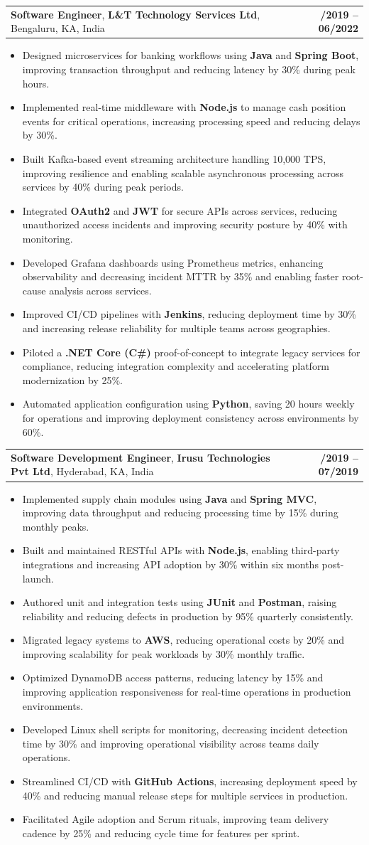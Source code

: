 \documentclass[letterpaper,11pt]{article}
\makeatletter
\newcommand{\resumeItem}[1]{
  \item\footnotesize{
    {#1 \vspace{-2pt}}
  }
}
\newcommand{\resumeSubheading}[4]{
  \vspace{-2pt}\item
    \begin{tabular*}{1.0\textwidth}[t]{l@{\extracolsep{\fill}}r}
      \textbf{\fontsize{10pt}{14pt}\selectfont #3}, \textbf{\fontsize{10pt}{14pt}\selectfont #1}, \fontsize{10pt}{14pt}\selectfont #4 & \textbf{\fontsize{10pt}{14pt}\selectfont #2} \\
    \end{tabular*}\vspace{-7pt}
}
\newcommand{\resumeItemListStart}{\begin{itemize}[leftmargin=*]}
\newcommand{\resumeItemListEnd}{\end{itemize}\vspace{-5pt}}
\makeatother
\begin{document}
    \resumeSubheading
        {L\&T Technology Services Ltd}{08/2019 -- 06/2022}
        {Software Engineer}{Bengaluru, KA, India}
      \resumeItemListStart
        \resumeItem{Designed microservices for banking workflows using \textbf{Java} and \textbf{Spring Boot}, improving transaction throughput and reducing latency by 30\% during peak hours.}
        \resumeItem{Implemented real-time middleware with \textbf{Node.js} to manage cash position events for critical operations, increasing processing speed and reducing delays by 30\%.}
        \resumeItem{Built Kafka-based event streaming architecture handling 10,000 TPS, improving resilience and enabling scalable asynchronous processing across services by 40\% during peak periods.}
        \resumeItem{Integrated \textbf{OAuth2} and \textbf{JWT} for secure APIs across services, reducing unauthorized access incidents and improving security posture by 40\% with monitoring.}
        \resumeItem{Developed Grafana dashboards using Prometheus metrics, enhancing observability and decreasing incident MTTR by 35\% and enabling faster root-cause analysis across services.}
        \resumeItem{Improved CI/CD pipelines with \textbf{Jenkins}, reducing deployment time by 30\% and increasing release reliability for multiple teams across geographies.}
        \resumeItem{Piloted a \textbf{.NET Core (C\#)} proof-of-concept to integrate legacy services for compliance, reducing integration complexity and accelerating platform modernization by 25\%.}
        \resumeItem{Automated application configuration using \textbf{Python}, saving 20 hours weekly for operations and improving deployment consistency across environments by 60\%.}
      \resumeItemListEnd

    \resumeSubheading
        {Irusu Technologies Pvt Ltd}{01/2019 -- 07/2019}
        {Software Development Engineer}{Hyderabad, KA, India}
      \resumeItemListStart
        \resumeItem{Implemented supply chain modules using \textbf{Java} and \textbf{Spring MVC}, improving data throughput and reducing processing time by 15\% during monthly peaks.}
        \resumeItem{Built and maintained RESTful APIs with \textbf{Node.js}, enabling third-party integrations and increasing API adoption by 30\% within six months post-launch.}
        \resumeItem{Authored unit and integration tests using \textbf{JUnit} and \textbf{Postman}, raising reliability and reducing defects in production by 95\% quarterly consistently.}
        \resumeItem{Migrated legacy systems to \textbf{AWS}, reducing operational costs by 20\% and improving scalability for peak workloads by 30\% monthly traffic.}
        \resumeItem{Optimized DynamoDB access patterns, reducing latency by 15\% and improving application responsiveness for real-time operations in production environments.}
        \resumeItem{Developed Linux shell scripts for monitoring, decreasing incident detection time by 30\% and improving operational visibility across teams daily operations.}
        \resumeItem{Streamlined CI/CD with \textbf{GitHub Actions}, increasing deployment speed by 40\% and reducing manual release steps for multiple services in production.}
        \resumeItem{Facilitated Agile adoption and Scrum rituals, improving team delivery cadence by 25\% and reducing cycle time for features per sprint.}
      \resumeItemListEnd
\end{document}
